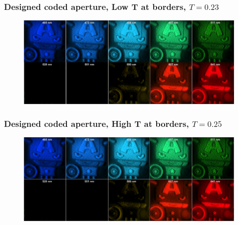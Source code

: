 \documentclass{beamer}
\begin{document}

\begin{frame}
\frametitle{Designed coded aperture, Low T at borders, $T=0.23$}

\begin{figure}
\includegraphics[scale=0.25]{FiguresUpd/real_desig_low.png}
\end{figure}
\begin{center}
\end{center}
\end{frame}


\begin{frame}
\frametitle{Designed coded aperture, High T at borders, $T=0.25$}

\begin{figure}
\includegraphics[scale=0.25]{FiguresUpd/real_desig_high.png}
\end{figure}
\begin{center}
\end{center}
\end{frame}

\end{document}
